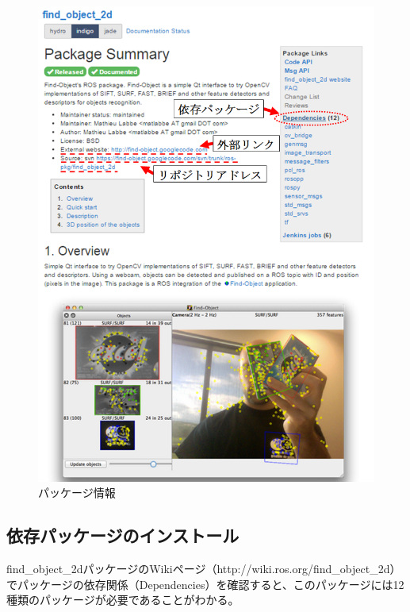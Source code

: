 \begin{figure}[htp]
  \centering
  \includegraphics[width=15cm]{pictures/chapter7/pic_07_06.png}
  \caption{パッケージ情報}
\end{figure}

\subsection{依存パッケージのインストール}

find\_object\_2dパッケージのWikiページ（http://wiki.ros.org/find\_object\_2d）でパッケージの依存関係（Dependencies）を確認すると、このパッケージには12種類のパッケージが必要であることがわかる。

